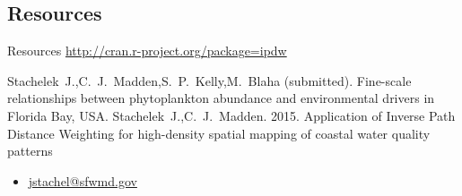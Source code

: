 \documentclass[compress,noflama,nosectionpages]{beamer}
\begin{document}
\subsection{Resources}
\begin{frame}{Resources}
  \centering
  \url{http://cran.r-project.org/package=ipdw}
  \begin{thebibliography}{10}
  \beamertemplatearticlebibitems
	Stachelek~J.,C.~J.~Madden,S.~P.~Kelly,M.~Blaha (submitted). Fine-scale relationships between phytoplankton abundance and environmental drivers in Florida Bay, USA.
	\newblock {}
	Stachelek~J.,C.~J.~Madden. 2015. Application of Inverse Path Distance Weighting for high-density spatial mapping of coastal water quality patterns
	\newblock {}
  \end{thebibliography}

	\begin{itemize}
		\item \url{jstachel@sfwmd.gov}
	\end{itemize}
\end{frame}
\end{document}
